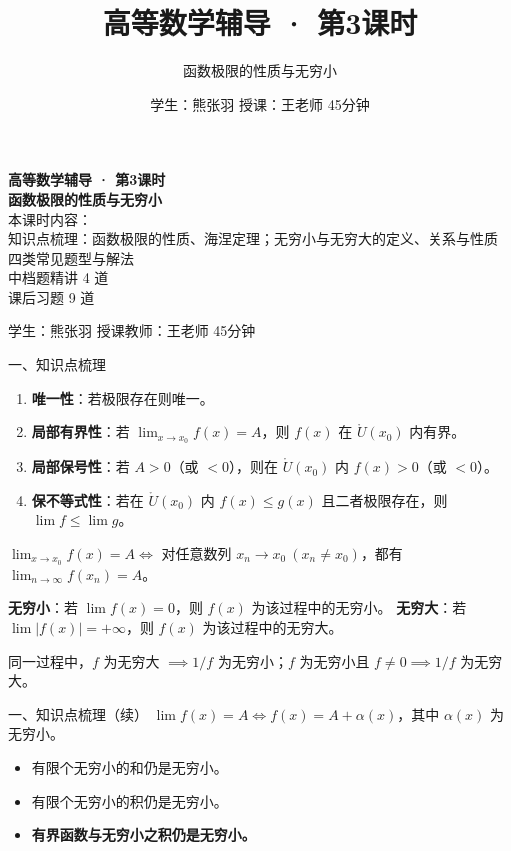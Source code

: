 \documentclass[aspectratio=169,11pt]{beamer}
\title{高等数学辅导 · 第3课时}
\subtitle{函数极限的性质与无穷小}
\author{学生：熊张羽 \quad 授课：王老师 \quad 45分钟}
\date{}
\begin{document}
\begin{frame}
\vspace{1.2cm}
{\color{navy}\bfseries\Huge 高等数学辅导 · 第3课时}\\[1.2em]
{\color{blacktext}\bfseries\LARGE 函数极限的性质与无穷小}\\[1.6em]
{\color{graytext}
本课时内容：\\[0.3em]
知识点梳理：函数极限的性质、海涅定理；无穷小与无穷大的定义、关系与性质\\
四类常见题型与解法\\
中档题精讲 4 道\\
课后习题 9 道
}
\vspace{1.4em}

{\color{graytext} 学生：熊张羽 \quad 授课教师：王老师 \quad 45分钟}
\end{frame}

\begin{frame}{一、知识点梳理}
\begin{enumerate}
  \item \textbf{唯一性}：若极限存在则唯一。
  \item \textbf{局部有界性}：若 $\lim_{x\to x_0}f(x)=A$，则 $f(x)$ 在 $\mathring{U}(x_0)$ 内有界。
  \item \textbf{局部保号性}：若 $A>0$（或 $<0$），则在 $\mathring{U}(x_0)$ 内 $f(x)>0$（或 $<0$）。
  \item \textbf{保不等式性}：若在 $\mathring{U}(x_0)$ 内 $f(x)\le g(x)$ 且二者极限存在，则 $\lim f\le \lim g$。
\end{enumerate}

$\displaystyle\lim_{x\to x_0}f(x)=A \iff$ 对任意数列 $x_n\to x_0\ (x_n\ne x_0)$，都有 $\displaystyle\lim_{n\to\infty}f(x_n)=A$。


\textbf{无穷小}：若 $\lim f(x)=0$，则 $f(x)$ 为该过程中的无穷小。
\textbf{无穷大}：若 $\lim |f(x)|=+\infty$，则 $f(x)$ 为该过程中的无穷大。

同一过程中，$f$ 为无穷大 $\implies 1/f$ 为无穷小；$f$ 为无穷小且 $f\ne 0 \implies 1/f$ 为无穷大。
\end{frame}

\begin{frame}{一、知识点梳理（续）}
$\lim f(x)=A \iff f(x)=A+\alpha(x)$，其中 $\alpha(x)$ 为无穷小。

\begin{itemize}
  \item 有限个无穷小的和仍是无穷小。
  \item 有限个无穷小的积仍是无穷小。
  \item \textbf{有界函数与无穷小之积仍是无穷小。}
\end{itemize}

\end{frame}
\end{document}
